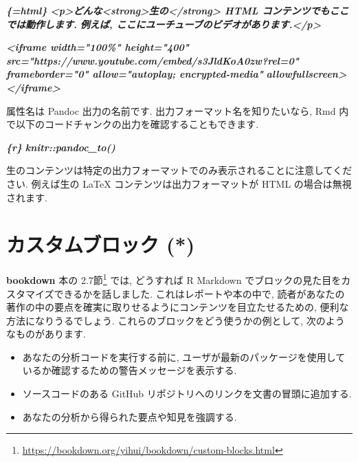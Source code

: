 \documentclass[
  11pt,
]{bxjsreport}
\newenvironment{Shaded}{\begin{snugshade}}{\end{snugshade}}
\newcommand{\InformationTok}[1]{\textcolor[rgb]{0.56,0.35,0.01}{\textbf{\textit{#1}}}}
\providecommand{\tightlist}{%
  \setlength{\itemsep}{0pt}\setlength{\parskip}{0pt}}
\renewcommand{\href}[2]{#2\footnote{\url{#1}}}
\begin{document}
\begin{Shaded}
\begin{Highlighting}[]
\InformationTok{\textasciigrave{}\textasciigrave{}\textasciigrave{}\{=html\}}
\InformationTok{\textless{}p\textgreater{}どんな\textless{}strong\textgreater{}生の\textless{}/strong\textgreater{} HTML コンテンツでもここでは動作します.}
\InformationTok{例えば, ここにユーチューブのビデオがあります.\textless{}/p\textgreater{}}

\InformationTok{\textless{}iframe width="100\%" height="400"}
\InformationTok{  src="https://www.youtube.com/embed/s3JldKoA0zw?rel=0"}
\InformationTok{  frameborder="0" allow="autoplay; encrypted{-}media"}
\InformationTok{  allowfullscreen\textgreater{}\textless{}/iframe\textgreater{}}
\InformationTok{\textasciigrave{}\textasciigrave{}\textasciigrave{}}
\end{Highlighting}
\end{Shaded}

属性名は Pandoc 出力の名前です. 出力フォーマット名を知りたいなら, Rmd 内で以下のコードチャンクの出力を確認することもできます.

\begin{Shaded}
\begin{Highlighting}[]
\InformationTok{\textasciigrave{}\textasciigrave{}\textasciigrave{}\{r\}}
\InformationTok{knitr::pandoc\_to()}
\InformationTok{\textasciigrave{}\textasciigrave{}\textasciigrave{}}
\end{Highlighting}
\end{Shaded}

生のコンテンツは特定の出力フォーマットでのみ表示されることに注意してください. 例えば生の LaTeX コンテンツは出力フォーマットが HTML の場合は無視されます.

\hypertarget{custom-blocks}{%
\section{カスタムブロック (*)}\label{custom-blocks}}

\textbf{bookdown} 本の \href{https://bookdown.org/yihui/bookdown/custom-blocks.html}{2.7節} では, どうすれば R Markdown でブロックの見た目をカスタマイズできるかを話しました. これはレポートや本の中で, 読者があなたの著作の中の要点を確実に取りせるようにコンテンツを目立たせるための, 便利な方法になりうるでしょう. これらのブロックをどう使うかの例として, 次のようなものがあります.

\begin{itemize}
\tightlist
\item
  あなたの分析コードを実行する前に, ユーザが最新のパッケージを使用しているか確認するための警告メッセージを表示する.
\item
  ソースコードのある GitHub リポジトリへのリンクを文書の冒頭に追加する.
\item
  あなたの分析から得られた要点や知見を強調する.
\end{itemize}
\end{document}
